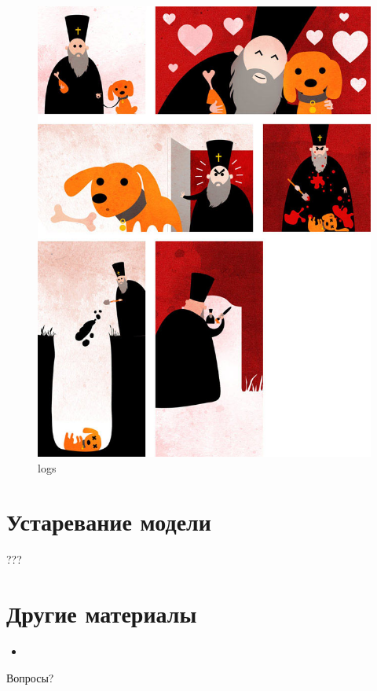 \documentclass[11pt]{article}
\makeatletter
\def\maxwidth{\ifdim\Gin@nat@width>\linewidth\linewidth
    \else\Gin@nat@width\fi}
\let\Oldincludegraphics\includegraphics
\renewcommand{\includegraphics}[1]{\Oldincludegraphics[width=.8\maxwidth]{#1}}
\makeatother
\begin{document}
\begin{figure}
\centering
\includegraphics{images/repeat_logs.jpg}
\caption{logs}
\end{figure}

    \hypertarget{ux443ux441ux442ux430ux440ux435ux432ux430ux43dux438ux435-ux43cux43eux434ux435ux43bux438}{%
\section{Устаревание
модели}\label{ux443ux441ux442ux430ux440ux435ux432ux430ux43dux438ux435-ux43cux43eux434ux435ux43bux438}}

???

    \hypertarget{ux434ux440ux443ux433ux438ux435-ux43cux430ux442ux435ux440ux438ux430ux43bux44b}{%
\section{Другие
материалы}\label{ux434ux440ux443ux433ux438ux435-ux43cux430ux442ux435ux440ux438ux430ux43bux44b}}

\begin{itemize}
\item
\end{itemize}

    Вопросы?


    
    
    
    
\end{document}
